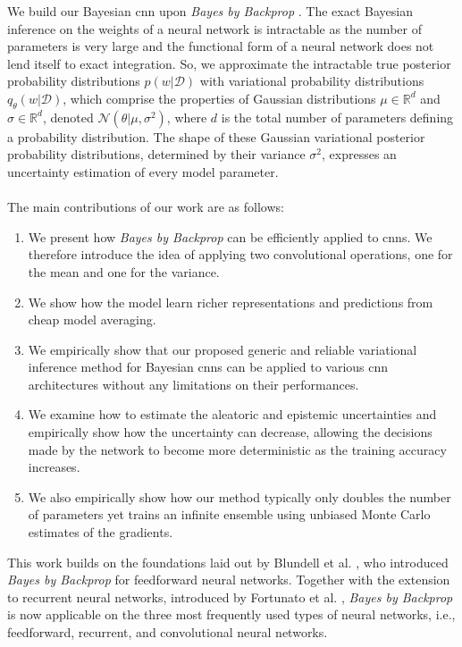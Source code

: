 \newline We build our Bayesian \ac{cnn} upon \textit{Bayes by Backprop} \cite{graves2011practical,blundell2015weight}. The exact Bayesian inference on the weights of a neural network is intractable as the number of parameters is very large and the functional form of a neural network does not lend itself to exact integration. So, we approximate the intractable true posterior probability distributions $p(w|\mathcal{D})$ with variational probability distributions $q_{\theta}(w|\mathcal{D})$, which comprise the properties of Gaussian distributions $\mu \in \mathbb{R}^d$ and $\sigma \in \mathbb{R}^d$, denoted $\mathcal{N}(\theta|\mu, \sigma^2)$, where $d$ is the total number of parameters defining a probability distribution. The shape of these Gaussian variational posterior probability distributions, determined by their variance $\sigma^2$, expresses an uncertainty estimation of every model parameter. \\ \\
\newline The main contributions of our work are as follows: 
\begin{enumerate}
    \item We present how \textit{Bayes by Backprop} can be efficiently applied to \acp{cnn}. We therefore introduce the idea of applying two convolutional operations, one for the mean and one for the variance.
    \item We show how the model learn richer representations and predictions from cheap model averaging.
    \item We empirically show that our proposed generic and reliable variational inference method for Bayesian \acp{cnn} can be applied to various \ac{cnn} architectures without any limitations on their performances. 
    \item We examine how to estimate the aleatoric and epistemic uncertainties and empirically show how the uncertainty can decrease, allowing the decisions made by the network to become more deterministic as the training accuracy increases. 
    \item We also empirically show how our method typically only doubles the number of parameters yet trains an infinite ensemble using unbiased Monte Carlo estimates of the gradients. 
\end{enumerate} 
This work builds on the foundations laid out by Blundell et al. \cite{blundell2015weight}, who introduced \textit{Bayes by Backprop} for feedforward neural networks. Together with the extension to recurrent neural networks, introduced by Fortunato et al. \cite{fortunato2017bayesian}, \textit{Bayes by Backprop} is now applicable on the three most frequently used types of neural networks, i.e., feedforward, recurrent, and convolutional neural networks.


